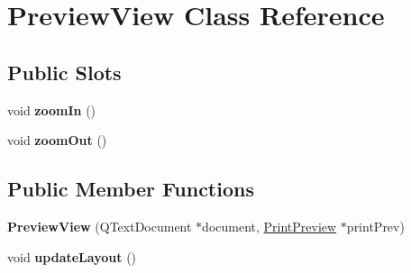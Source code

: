 \hypertarget{classPreviewView}{
\section{PreviewView Class Reference}
\label{classPreviewView}
}
\subsection*{Public Slots}
\begin{DoxyCompactItemize}
\item 
\hypertarget{classPreviewView_a2eb6beb0f6138eb7612ddebf98574be3}{
void {\bfseries zoomIn} ()}
\label{classPreviewView_a2eb6beb0f6138eb7612ddebf98574be3}

\item 
\hypertarget{classPreviewView_a0d17404752b71ba4b111bc7cc9a7a158}{
void {\bfseries zoomOut} ()}
\label{classPreviewView_a0d17404752b71ba4b111bc7cc9a7a158}

\end{DoxyCompactItemize}
\subsection*{Public Member Functions}
\begin{DoxyCompactItemize}
\item 
\hypertarget{classPreviewView_af488e15ffc3170ee268822b477f36c59}{
{\bfseries PreviewView} (QTextDocument $\ast$document, \hyperlink{classPrintPreview}{PrintPreview} $\ast$printPrev)}
\label{classPreviewView_af488e15ffc3170ee268822b477f36c59}

\item 
\hypertarget{classPreviewView_acdfe534bae625626c7fbe6ab86770048}{
void {\bfseries updateLayout} ()}
\label{classPreviewView_acdfe534bae625626c7fbe6ab86770048}

\end{DoxyCompactItemize}
